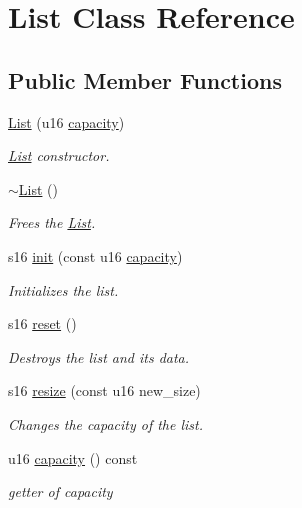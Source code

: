 \hypertarget{class_list}{}\section{List Class Reference}
\label{class_list}
\subsection*{Public Member Functions}
\begin{DoxyCompactItemize}
\item 
\hyperlink{class_list_a65d13ae9c7a02b28980df793dd088ced}{List} (u16 \hyperlink{class_list_a6c7a40924805f3a51e32f5685bf21e38}{capacity})
\begin{DoxyCompactList}\small\item\em \hyperlink{class_list}{List} constructor. \end{DoxyCompactList}\item 
\hyperlink{class_list_a70aecf37bd9d779a394e4d50377fbf5f}{$\sim$\+List} ()
\begin{DoxyCompactList}\small\item\em Frees the \hyperlink{class_list}{List}. \end{DoxyCompactList}\item 
s16 \hyperlink{class_list_a6c55b7617f9e76681a7f621b7b2fa9c4}{init} (const u16 \hyperlink{class_list_a6c7a40924805f3a51e32f5685bf21e38}{capacity})
\begin{DoxyCompactList}\small\item\em Initializes the list. \end{DoxyCompactList}\item 
s16 \hyperlink{class_list_a7702463087250534672ac2042bf814aa}{reset} ()
\begin{DoxyCompactList}\small\item\em Destroys the list and it\textquotesingle{}s data. \end{DoxyCompactList}\item 
s16 \hyperlink{class_list_a2998b3c97560a4684d9bbfda30c91ada}{resize} (const u16 new\+\_\+size)
\begin{DoxyCompactList}\small\item\em Changes the capacity of the list. \end{DoxyCompactList}\item 
u16 \hyperlink{class_list_a6c7a40924805f3a51e32f5685bf21e38}{capacity} () const
\begin{DoxyCompactList}\small\item\em getter of capacity \end{DoxyCompactList}\item 

\end{DoxyCompactItemize}
